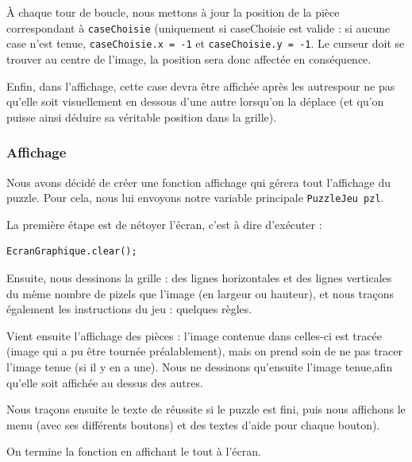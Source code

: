 \documentclass[]{article}
\newcommand{\variable}[1]{\noindent \texttt{#1}}
\begin{document}
À chaque tour de boucle, nous mettons à jour la position de la pièce correspondant à \variable{caseChoisie} (uniquement si caseChoisie est valide : si aucune case n'est tenue, \variable{caseChoisie.x = -1} et \variable{caseChoisie.y = -1}. Le curseur doit se trouver au centre de l'image, la position sera donc affectée en conséquence.

Enfin, dans l'affichage, cette case devra être affichée après les autrespour ne pas qu'elle soit visuellement en dessous d'une autre lorsqu'on la déplace (et qu'on puisse ainsi déduire sa véritable position dans la grille).

\subsubsection{Affichage}

Nous avons décidé de créer une fonction affichage qui gérera tout l'affichage du puzzle. Pour cela, nous lui envoyons notre variable principale \variable{PuzzleJeu pzl}.

La première étape est de nétoyer l'écran, c'est à dire d'exécuter : 
\begin{lstlisting}
EcranGraphique.clear();
\end{lstlisting}

Ensuite, nous dessinons la grille : des lignes horizontales et des lignes verticales du même nombre de pizels que l'image (en largeur ou hauteur), et nous traçons également les instructions du jeu : quelques règles.

Vient ensuite l'affichage des pièces : l'image contenue dans celles-ci est tracée (image qui a pu être tournée préalablement), mais on prend soin de ne pas tracer l'image tenue (si il y en a une). Nous ne dessinons qu'ensuite l'image tenue,afin qu'elle soit affichée au dessus des autres.

Nous traçons ensuite le texte de réussite si le puzzle est fini, puis nous affichons le menu (avec ses différents boutons) et des textes d'aide pour chaque bouton).

On termine la fonction en affichant le tout à l'écran. 


\newpage
\tableofcontents
\end{document}
